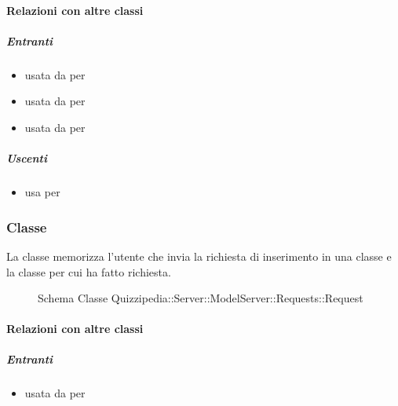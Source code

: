 \paragraph{Relazioni con altre classi}
\subparagraph{Entranti}
\begin{itemize}
\item usata da  per 
\item usata da  per 
\item usata da  per 
\end{itemize}
\subparagraph{Uscenti}
\begin{itemize}
\item usa  per 
\end{itemize}
\subsubsection{Classe }
La classe memorizza l'utente che invia la richiesta di inserimento in una classe e la classe per cui ha fatto richiesta.
\begin{figure}[H]
\centering
\noindent{}
\caption[Schema Classe Request]{Schema Classe Quizzipedia::Server::ModelServer::Requests::Request}
\end{figure}
\paragraph{Relazioni con altre classi}
\subparagraph{Entranti}
\begin{itemize}
\item usata da  per 
\end{itemize}
